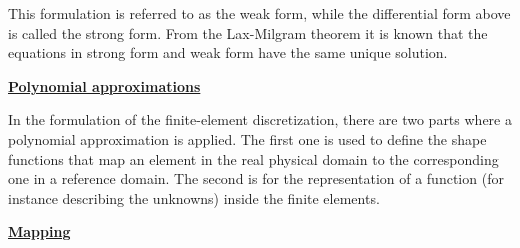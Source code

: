             This formulation is referred to as the weak form, while the differential form above is called the strong form.
From the Lax-Milgram theorem it is known that the equations in strong form and weak form have the same unique solution.

\noindent
        \underline{\textbf{Polynomial approximations}}

            In the formulation of the finite-element discretization, there are two parts where a polynomial approximation is applied. The first one is used
to define the shape functions that map an element in the real physical domain to the corresponding one in a reference domain.
The second is for the representation of a function (for instance describing the unknowns) inside the finite elements.

\noindent
        \underline{\textbf{Mapping}}

